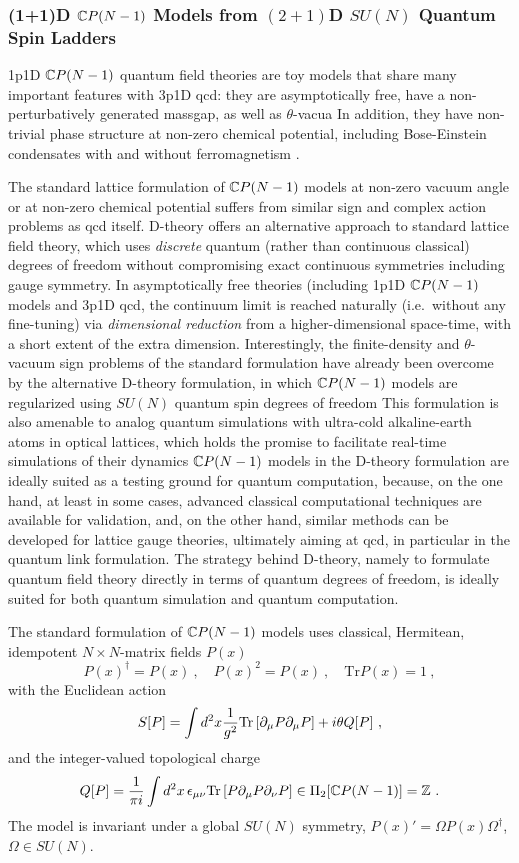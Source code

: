 \subsubsection{(1+1)D ${\mathbb{C}P}(N-1)$ Models from $(2+1)$D $SU(N)$ Quantum Spin Ladders}

\gls{1p1D} ${\mathbb{C}P}(N-1)$ quantum field theories are toy models that share many important features with \gls{3p1D} \gls{qcd}: they are asymptotically free,  have a non-perturbatively generated massgap, as well as $\theta$-vacua \cite{d19781n,eichenherr1978n}
In addition, they have non-trivial phase structure at non-zero chemical potential, including Bose-Einstein condensates with and without ferromagnetism \cite{evans20183}. 

The standard lattice formulation of ${\mathbb{C}P}(N-1)$ models at non-zero vacuum angle or at non-zero chemical potential suffers from similar sign and complex action problems as \gls{qcd} itself.
D-theory offers an alternative approach to standard lattice field theory, which uses {\em discrete} quantum (rather than continuous classical) degrees of freedom without compromising exact continuous symmetries including gauge symmetry. In asymptotically free theories (including \gls{1p1D} 
${\mathbb{C}P}(N-1)$ models and \gls{3p1D} \gls{qcd}, the continuum limit is reached naturally (i.e.\ without any fine-tuning) via {\em dimensional reduction} from a higher-dimensional space-time, with a short extent of the extra dimension.
Interestingly, the finite-density and $\theta$-vacuum sign problems of the standard formulation have already been overcome by the alternative D-theory formulation, in which ${\mathbb{C}P}(N-1)$ models are regularized using $SU(N)$ quantum spin degrees of freedom \cite{beard2005study}
This formulation is also amenable to analog quantum simulations with ultra-cold alkaline-earth atoms in  optical lattices, which holds the promise to facilitate real-time simulations of their dynamics \cite{laflamme2016cp}
${\mathbb{C}P}(N-1)$ models in the D-theory formulation are ideally suited as a testing ground for quantum computation, because, on the one hand, at least in some cases, advanced classical computational techniques are available  for validation, and, on the other hand, similar methods can be developed for lattice gauge theories, ultimately aiming at \gls{qcd}, in particular in the quantum
link formulation. 
The strategy behind D-theory, namely to formulate quantum field theory directly in terms of quantum degrees of freedom, is ideally suited for both quantum simulation and quantum computation.

The standard formulation of ${\mathbb{C}P}(N-1)$ models uses classical, Hermitean, idempotent $N \times N$-matrix fields $P(x)$
\[P(x)^\dagger = P(x) \ , \quad P(x)^2 = P(x) \ , \quad \mbox{Tr} P(x) = 1 \ , \]
with the Euclidean action
\[S[P] = \int d^2 x  \frac{1}{g^2} \mbox{Tr}\left[\partial_\mu P \partial_\mu P\right] + i \theta Q[P] \ ,\]
and the integer-valued topological charge
\[Q[P] = \frac{1}{\pi i} \int d^2 x \, \epsilon_{\mu\nu} \mbox{Tr} \left[P \partial_\mu P \partial_\nu P\right] \in \Pi_2[{\mathbb{C}P}(N-1)] = {\mathbb{Z}} \ .\]
The model is invariant under a global $SU(N)$ symmetry, $P(x)' = \Omega P(x) \Omega^\dagger$, $\Omega \in SU(N)$. 

